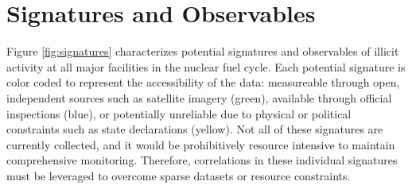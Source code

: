 \section{Signatures and Observables}
\label{s_signatures}



Figure \ref{fig:signatures} characterizes potential signatures and observables of illicit activity at all major facilities in the nuclear fuel cycle.  Each potential signature is color coded to represent the accessibility of the data: measureable through open, independent sources such as satellite imagery (green), available through official inspections (blue), or potentially unreliable due to physical or political constraints such as state declarations (yellow).  Not all of these signatures are currently collected, and it would be prohibitively resource intensive to maintain comprehensive monitoring. Therefore, correlations in these individual signatures must be leveraged to overcome sparse datasets or resource constraints.


